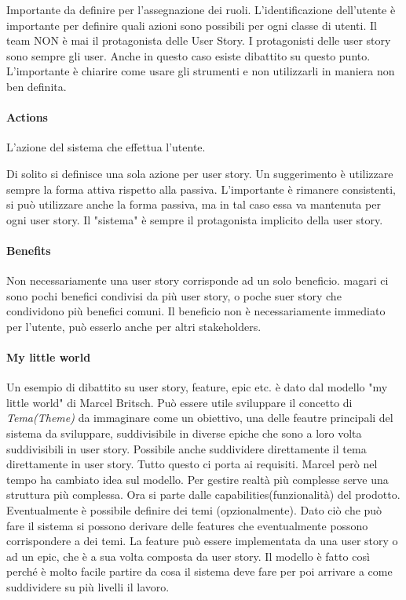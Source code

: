 \noindent Importante da definire per l'assegnazione dei ruoli. L'identificazione dell'utente è importante per definire quali azioni sono possibili per ogni classe di utenti. Il team NON è mai il protagonista delle User Story. I protagonisti delle user story sono sempre gli user. Anche in questo caso esiste dibattito su questo punto. L'importante è chiarire come usare gli strumenti e non utilizzarli in maniera non ben definita.
\paragraph{Actions}
L'azione del sistema che effettua l'utente.

\noindent Di solito si definisce una sola azione per user story. Un suggerimento è utilizzare sempre la forma attiva rispetto alla passiva. L'importante è rimanere consistenti, si può utilizzare anche la forma passiva, ma in tal caso essa va mantenuta per ogni user story. Il "sistema" è sempre il protagonista implicito della user story.
\paragraph{Benefits}
Non necessariamente una user story corrisponde ad un solo beneficio. magari ci sono pochi benefici condivisi da più user story, o poche suer story che condividono più benefici comuni. Il beneficio non è necessariamente immediato per l'utente, può esserlo anche per altri stakeholders.

\paragraph{My little world}
Un esempio di dibattito su user story, feature, epic etc. è dato dal modello "my little world" di Marcel Britsch. Può essere utile sviluppare il concetto di \textit{Tema(Theme)} da immaginare come un obiettivo, una delle feautre principali del sistema da sviluppare, suddivisibile in diverse epiche che sono a loro volta suddivisibili in user story. Possibile anche suddividere direttamente il tema direttamente in user story. Tutto questo ci porta ai requisiti.\newline
{}
\noindent Marcel però nel tempo ha cambiato idea sul modello. Per gestire realtà più complesse serve una struttura più complessa. Ora si parte dalle capabilities(funzionalità) del prodotto. Eventualmente è possibile definire dei temi (opzionalmente). Dato ciò che può fare il sistema si possono derivare delle features che eventualmente possono corrispondere a dei temi. La feature può essere implementata da una user story o ad un epic, che è a sua volta composta da user story. Il modello è fatto così perché è molto facile partire da cosa il sistema deve fare per poi arrivare a come suddividere su più livelli il lavoro.

